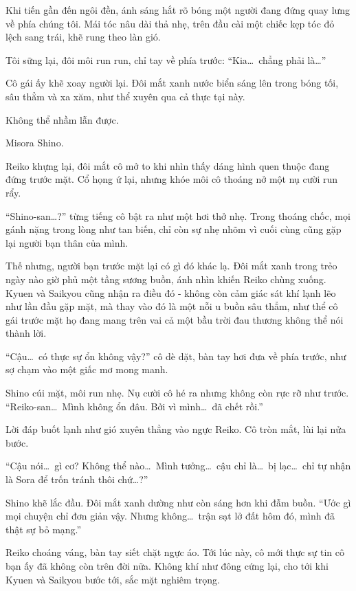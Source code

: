 \documentclass[../main.tex]{subfiles}
\begin{document}
Khi tiến gần đến ngôi đền, ánh sáng hắt rõ bóng một người đang đứng quay lưng về phía chúng tôi. Mái tóc nâu dài thả nhẹ, trên đầu cài một chiếc kẹp tóc đỏ lệch sang trái, khẽ rung theo làn gió.


Tôi sững lại, đôi môi run run, chỉ tay về phía trước: ``Kia\dots\ chẳng phải là\dots''

Cô gái ấy khẽ xoay người lại. Đôi mắt xanh nước biển sáng lên trong bóng tối, sâu thẳm và xa xăm, như thể xuyên qua cả thực tại này.

Không thể nhầm lẫn được.

Misora Shino.

\pov{-}

Reiko khựng lại, đôi mắt cô mở to khi nhìn thấy dáng hình quen thuộc đang đứng trước mặt. Cổ họng ứ lại, nhưng khóe môi cô thoáng nở một nụ cười run rẩy.

``Shino-san\dots?'' từng tiếng cô bật ra như một hơi thở nhẹ. Trong thoáng chốc, mọi gánh nặng trong lòng như tan biến, chỉ còn sự nhẹ nhõm vì cuối cùng cũng gặp lại người bạn thân của mình.

Thế nhưng, người bạn trước mặt lại có gì đó khác lạ. Đôi mắt xanh trong trẻo ngày nào giờ phủ một tầng sương buồn, ánh nhìn khiến Reiko chùng xuống. Kyuen và Saikyou cũng nhận ra điều đó - không còn cảm giác sát khí lạnh lẽo như lần đầu gặp mặt, mà thay vào đó là một nỗi u buồn sâu thẳm, như thể cô gái trước mặt họ đang mang trên vai cả một bầu trời đau thương không thể nói thành lời.

``Cậu\dots\ có thực sự ổn không vậy?'' cô dè dặt, bàn tay hơi đưa về phía trước, như sợ chạm vào một giấc mơ mong manh.

Shino cúi mặt, môi run nhẹ. Nụ cười cô hé ra nhưng không còn rực rỡ như trước. ``Reiko-san\dots\ Mình không ổn đâu. Bởi vì mình\dots\ đã chết rồi.''

Lời đáp buốt lạnh như gió xuyên thẳng vào ngực Reiko. Cô tròn mắt, lùi lại nửa bước.

``Cậu nói\dots\ gì cơ? Không thể nào\dots\ Mình tưởng\dots\ cậu chỉ là\dots\ bị lạc\dots\ chỉ tự nhận là Sora để trốn tránh thôi chứ\dots?''

Shino khẽ lắc đầu. Đôi mắt xanh dường như còn sáng hơn khi đẫm buồn. ``Ước gì mọi chuyện chỉ đơn giản vậy. Nhưng không\dots\ trận sạt lở đất hôm đó, mình đã thật sự bỏ mạng.''

Reiko choáng váng, bàn tay siết chặt ngực áo.  Tới lúc này, cô mới thực sự tin cô bạn ấy đã không còn trên đời nữa. Không khí như đông cứng lại, cho tới khi Kyuen và Saikyou bước tới, sắc mặt nghiêm trọng.
\end{document}
